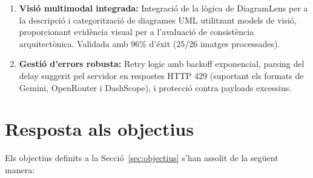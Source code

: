 \documentclass[12pt,a4paper,twoside]{report}
\begin{document}
\begin{enumerate}
    \item \textbf{Visi\'o multimodal integrada:} Integraci\'o de la l\`ogica de DiagramLens per a la descripci\'o i categoritzaci\'o de diagrames UML utilitzant models de visi\'o, proporcionant evid\`encia visual per a l'avaluaci\'o de consist\`encia arquitect\`onica. Validada amb 96\% d'\'exit (25/26 imatges processades).

    \item \textbf{Gesti\'o d'errors robusta:} Retry logic amb backoff exponencial, parsing del delay suggerit pel servidor en respostes HTTP 429 (suportant els formats de Gemini, OpenRouter i DashScope), i protecci\'o contra payloads excessius.
\end{enumerate}

\section{Resposta als objectius}
\label{sec:resposta-objectius}

Els objectius definits a la Secci\'o~\ref{sec:objectius} s'han assolit de la seg\"uent manera:
\end{document}
